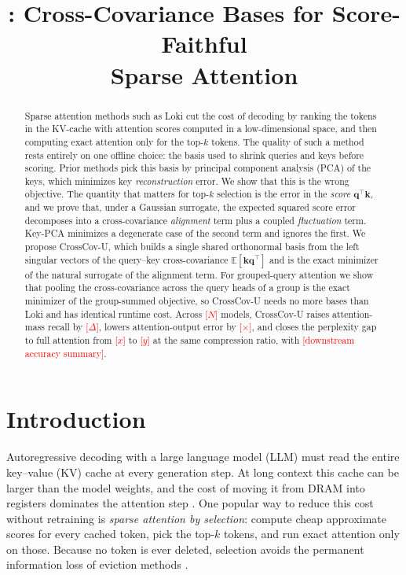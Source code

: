 \documentclass[10pt]{article}
\title{\method{}: Cross-Covariance Bases for Score-Faithful\\Sparse Attention}
\author{\TODO{Author list and affiliations}}
\date{}
\newcommand{\TODO}[1]{\textcolor{red}{[#1]}}
\newcommand{\E}{\mathbb{E}}
\newcommand{\bq}{\mathbf{q}}
\newcommand{\bk}{\mathbf{k}}
\newcommand{\method}{CrossCov-U}
\theoremstyle{plain}
\theoremstyle{definition}
\theoremstyle{remark}
\begin{document}
\maketitle

\begin{abstract}
Sparse attention methods such as Loki cut the cost of decoding by ranking the
tokens in the KV-cache with attention scores computed in a low-dimensional
space, and then computing exact attention only for the top-$k$ tokens.
The quality of such a method rests entirely on one offline choice: the basis
used to shrink queries and keys before scoring.
Prior methods pick this basis by principal component analysis (PCA) of the keys,
which minimizes key \emph{reconstruction} error.
We show that this is the wrong objective.
The quantity that matters for top-$k$ selection is the error in the
\emph{score} $\bq^\top\bk$, and we prove that, under a Gaussian surrogate, the
expected squared score error decomposes into a cross-covariance
\emph{alignment} term plus a coupled \emph{fluctuation} term.
Key-PCA minimizes a degenerate case of the second term and ignores the first.
We propose \method{}, which builds a single shared orthonormal basis from the
left singular vectors of the query--key cross-covariance $\E[\bk\bq^\top]$
and is the exact minimizer of the natural surrogate of the alignment term.
For grouped-query attention we show that pooling the cross-covariance across
the query heads of a group is the exact minimizer of the group-summed objective,
so \method{} needs no more bases than Loki and has identical runtime cost.
Across \TODO{$N$} models, \method{} raises attention-mass recall by
\TODO{$\Delta$}, lowers attention-output error by \TODO{$\times$}, and closes
the perplexity gap to full attention from \TODO{$x$} to \TODO{$y$} at the same
compression ratio, with \TODO{downstream accuracy summary}.
\end{abstract}

\section{Introduction}
\label{sec:intro}

Autoregressive decoding with a large language model (LLM) must read the entire
key--value (KV) cache at every generation step. At long context this cache can
be larger than the model weights, and the cost of moving it from DRAM into
registers dominates the attention step \citep{loki,sparq}. One popular way to
reduce this cost without retraining is \emph{sparse attention by selection}:
compute cheap approximate scores for every cached token, pick the top-$k$
tokens, and run exact attention only on those. Because no token is ever
deleted, selection avoids the permanent information loss of eviction methods
\citep{h2o,streamingllm}.
\end{document}
